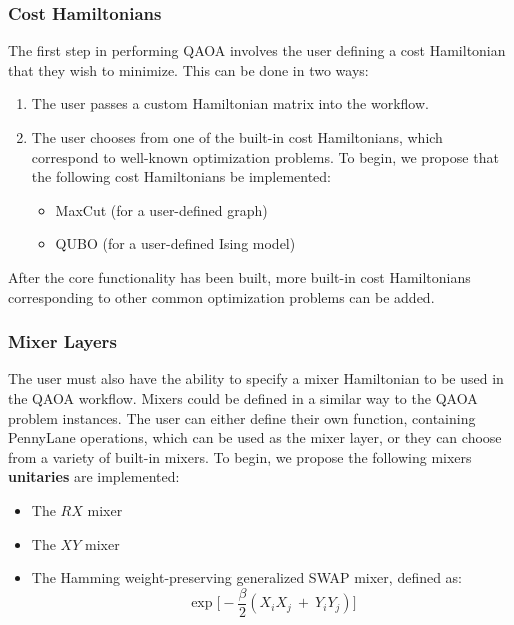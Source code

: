 \documentclass{article}
\begin{document}
\subsubsection{Cost Hamiltonians}

The first step in performing QAOA involves the user defining a cost Hamiltonian that 
they wish to minimize. This can be done in two ways:

\begin{enumerate}
	\item The user passes a custom Hamiltonian matrix into the workflow.
	\item The user chooses from one of the built-in cost Hamiltonians, which 
              correspond to well-known optimization problems. To begin, we propose 
   	      that the following cost Hamiltonians be implemented:
	      \begin{itemize}
		      \item MaxCut (for a user-defined graph)
		      \item QUBO (for a user-defined Ising model)
		\end{itemize}
\end{enumerate}
  \noindent 
   After the core functionality has been built, more built-in cost Hamiltonians 
   corresponding to other common optimization problems can be added.

\subsubsection{Mixer Layers}

The user must also have the ability to specify a mixer Hamiltonian to be used 
in the QAOA workflow.
\newline\newline
\noindent
Mixers could be defined in a similar way to the QAOA problem instances.
The user can either define their own function, containing PennyLane operations, which 
can be used as the mixer layer, or they can choose from a variety of built-in mixers.
To begin, we propose the following mixers \textbf{unitaries} are implemented:

\begin{itemize}
	\item The $RX$ mixer
	\item The $XY$ mixer
	\item The Hamming weight-preserving generalized SWAP mixer, defined as:
		$$\exp \Big[ - \frac{\beta}{2} (X_{i} X_{j} \ + \ Y_{i} Y_{j}) \Big]$$
\end{itemize}
\end{document}
